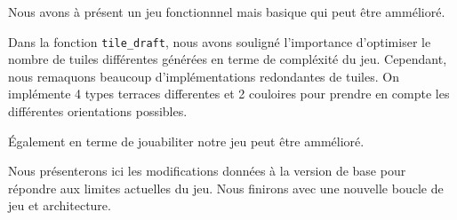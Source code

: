 Nous avons à présent un jeu fonctionnnel mais basique qui peut être ammélioré.

Dans la fonction \texttt{tile\_draft}, nous avons souligné l’importance d’optimiser le nombre de tuiles différentes générées en terme de compléxité du jeu. Cependant, nous remaquons beaucoup d'implémentations redondantes de tuiles. On implémente 4 types terraces differentes et 2 couloires pour prendre en compte les différentes orientations possibles.

\'Egalement en terme de jouabiliter notre jeu peut être ammélioré.

Nous présenterons ici les modifications données à la version de base pour répondre aux limites actuelles du jeu. Nous finirons avec une nouvelle boucle de jeu et architecture.
